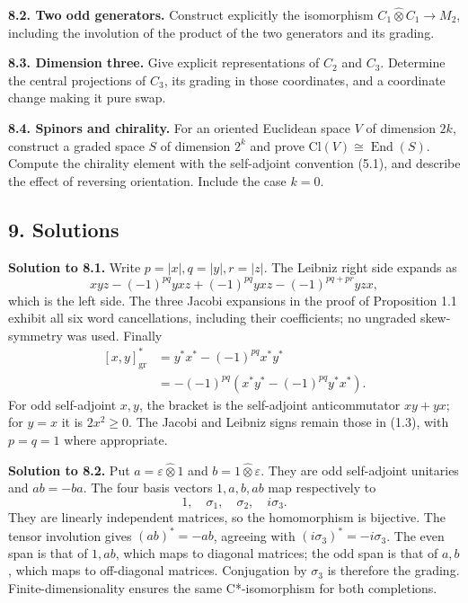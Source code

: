 \documentclass[
  11pt,
]{article}
\begin{document}
\textbf{8.2. Two odd generators.} Construct explicitly the isomorphism
\(C_1\widehat\otimes C_1\to M_2\), including the involution of the
product of the two generators and its grading.

\textbf{8.3. Dimension three.} Give explicit representations of \(C_2\)
and \(C_3\). Determine the central projections of \(C_3\), its grading
in those coordinates, and a coordinate change making it pure swap.

\textbf{8.4. Spinors and chirality.} For an oriented Euclidean space
\(V\) of dimension \(2k\), construct a graded space \(S\) of dimension
\(2^k\) and prove \(\mathrm{Cl}(V)\cong\operatorname{End}(S)\). Compute
the chirality element with the self-adjoint convention (5.1), and
describe the effect of reversing orientation. Include the case \(k=0\).

\subsection{9. Solutions}\label{solutions}

\textbf{Solution to 8.1.} Write \(p=|x|,q=|y|,r=|z|\). The Leibniz right
side expands as \[
xyz-(-1)^{pq}yxz
+(-1)^{pq}yxz-(-1)^{pq+pr}yzx,
\] which is the left side. The three Jacobi expansions in the proof of
Proposition 1.1 exhibit all six word cancellations, including their
coefficients; no ungraded skew-symmetry was used. Finally \[
\begin{aligned}
\left[x,y\right]_{\mathrm{gr}}^*
 &=y^*x^*-(-1)^{pq}x^*y^*\\
 &=-(-1)^{pq}
   (x^*y^*-(-1)^{pq}y^*x^*).
\end{aligned}
\] For odd self-adjoint \(x,y\), the bracket is the self-adjoint
anticommutator \(xy+yx\); for \(y=x\) it is \(2x^2\geq0\). The Jacobi
and Leibniz signs remain those in (1.3), with \(p=q=1\) where
appropriate.

\textbf{Solution to 8.2.} Put \(a=\varepsilon\widehat\otimes1\) and
\(b=1\widehat\otimes\varepsilon\). They are odd self-adjoint unitaries
and \(ab=-ba\). The four basis vectors \(1,a,b,ab\) map respectively to
\[
1,\quad \sigma_1,\quad\sigma_2,\quad i\sigma_3.
\] They are linearly independent matrices, so the homomorphism is
bijective. The tensor involution gives \((ab)^*=-ab\), agreeing with
\((i\sigma_3)^*=-i\sigma_3\). The even span is that of \(1,ab\), which
maps to diagonal matrices; the odd span is that of \(a,b\), which maps
to off-diagonal matrices. Conjugation by \(\sigma_3\) is therefore the
grading. Finite-dimensionality ensures the same C*-isomorphism for both
completions.
\end{document}
